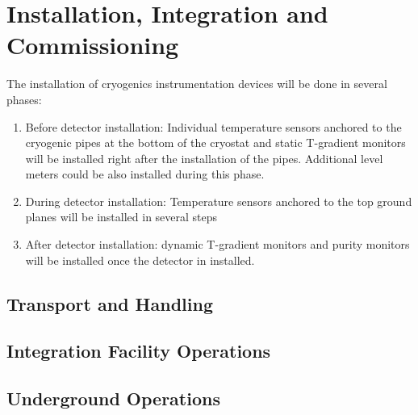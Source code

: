 \section{Installation, Integration and Commissioning}
\label{sec:fdsp-slow-cryo-install}

The installation of cryogenics instrumentation devices will be done in several phases:
\begin{enumerate}
\item Before detector installation: Individual temperature sensors anchored to the cryogenic pipes at the bottom of the cryostat and static T-gradient monitors
  will be installed right after the installation of the pipes. Additional level meters could be also installed during this phase. 
\item During detector installation: Temperature sensors anchored to the top ground planes will be installed in several steps
\item After detector installation: dynamic T-gradient monitors and purity monitors will be installed once the detector in installed. 
\end{enumerate}




\subsection{Transport and Handling}
\label{sec:fdsp-slow-cryo-install-transport}


\subsection{Integration Facility Operations}
\label{sec:fdsp-slow-cryo-install-facil-ops}


\subsection{Underground Operations}
\label{sec:fdsp-slow-cryo-install-undergr}

